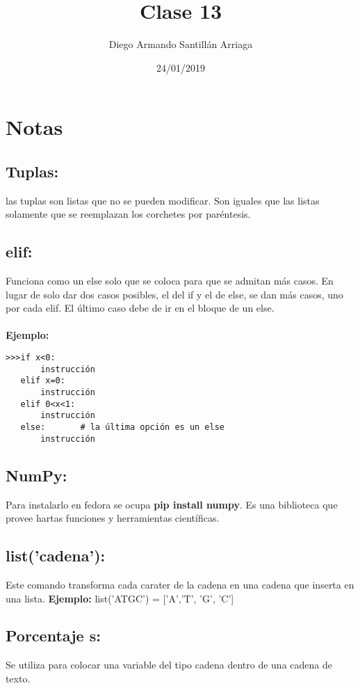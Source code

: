 \documentclass[letter paper, 12pt, oneside]{article}
\title{\Huge Clase 13}
\author{Diego Armando Santillán Arriaga}
\date{24/01/2019}
\begin{document}
	\maketitle	
	\newpage
\section*{Notas}
\subsection*{Tuplas:}
las tuplas son listas que no se pueden modificar. Son iguales que las listas solamente que se reemplazan los corchetes por paréntesis. 

\subsection*{elif:} Funciona como un else solo que se coloca para que se admitan más casos. En lugar de solo dar dos casos posibles, el del if y el de else, se dan más casos, uno por cada elif. El último caso debe de ir en el bloque de un else. 
\\\\
\textbf{Ejemplo:}
\begin{verbatim}
>>>if x<0:
       instrucción
   elif x=0:
       instrucción
   elif 0<x<1:
       instrucción
   else:       # la última opción es un else
       instrucción
\end{verbatim}

\subsection*{NumPy:}
Para instalarlo en fedora se ocupa \textbf{pip install numpy}. Es una biblioteca que provee hartas funciones y herramientas científicas.   
     	
\subsection*{list('cadena'):}
Este comando transforma cada carater de la cadena en una cadena que inserta en una lista. 
\textbf{Ejemplo:}
list('ATGC') = ['A','T', 'G', 'C']

\subsection*{Porcentaje s:}
Se utiliza para colocar una variable del tipo cadena dentro de una cadena de texto.
\end{document}
